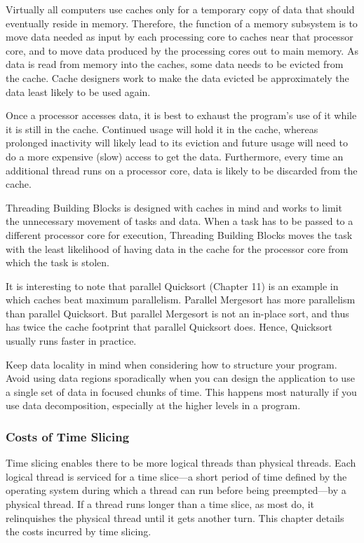 Virtually all computers use caches only for a temporary copy of data
that should eventually reside in memory. Therefore, the function of a
memory subsystem is to move data needed as input by each processing
core to caches near that processor core, and to move data produced by
the processing cores out to main memory. As data is read from memory
into the caches, some data needs to be evicted from the cache. Cache
designers work to make the data evicted be approximately the data
least likely to be used again.

Once a processor accesses data, it is best to exhaust the program’s
use of it while it is still in the cache. Continued usage will hold it
in the cache, whereas prolonged inactivity will likely lead to its
eviction and future usage will need to do a more expensive (slow)
access to get the data. Furthermore, every time an additional thread
runs on a processor core, data is likely to be discarded from the
cache.

Threading Building Blocks is designed with caches in mind and works to
limit the unnecessary movement of tasks and data. When a task has to
be passed to a different processor core for execution, Threading
Building Blocks moves the task with the least likelihood of having
data in the cache for the processor core from which the task is
stolen.

It is interesting to note that parallel Quicksort (Chapter 11) is an
example in which caches beat maximum parallelism. Parallel Mergesort
has more parallelism than parallel Quicksort. But parallel Mergesort
is not an in-place sort, and thus has twice the cache footprint that
parallel Quicksort does. Hence, Quicksort usually runs faster in
practice.

Keep data locality in mind when considering how to structure your
program. Avoid using data regions sporadically when you can design the
application to use a single set of data in focused chunks of
time. This happens most naturally if you use data decomposition,
especially at the higher levels in a program.

\subsubsection{Costs of Time Slicing}

Time slicing enables there to be more logical threads than physical
threads. Each logical thread is serviced for a time slice—a short
period of time defined by the operating system during which a thread
can run before being preempted—by a physical thread. If a thread runs
longer than a time slice, as most do, it relinquishes the physical
thread until it gets another turn. This chapter details the costs
incurred by time slicing.

